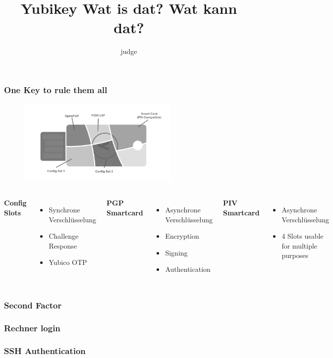 \documentclass{beamer}
\title{Yubikey Wat is dat? Wat kann dat?}
\author{judge}
\date{}
\begin{document}
 
\frame{\titlepage}

\begin{frame}
\frametitle{One Key to rule them all}
	\begin{figure}[h]
		\center
		\includegraphics[width=0.7\textwidth]{images/functionality.png}
	\end{figure}
	\begin{columns}
			\pause
			\textbf{Config Slots}
			\begin{itemize}
				\item<3->{Synchrone Verschlüsselung}
				\item<3->{Challenge Response}
				\item<3->{Yubico OTP}
			\end{itemize}
			\textbf{PGP Smartcard}
			\begin{itemize}
				\item<4->{Asynchrone Verschlüsselung}
				\item<4->{Encryption}
				\item<4->{Signing}
				\item<4->{Authentication}
			\end{itemize}
			\textbf{PIV Smartcard}
			\begin{itemize}
				\item<5->{Asynchrone Verschlüsselung}
				\item<5->{4 Slots usable for multiple purposes}
			\end{itemize}
	\end{columns}
\end{frame}

\begin{frame}
\frametitle{Second Factor}
\end{frame}

\begin{frame}
\frametitle{Rechner login}
\end{frame}

\begin{frame}
\frametitle{SSH Authentication}
\end{frame}
\end{document}
